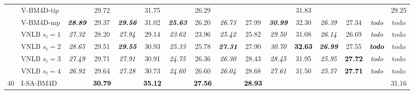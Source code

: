 \documentclass[10pt, journal, twocolumn, final, a4paper]{IEEEtran}
\newcommand{\bsic}[1]{\textcolor{black}{\textit{#1}}}
\newcommand{\Bsic}[1]{\textcolor{black}{\textbf{\textit{#1}}}}
\newcommand{\Best}[1]{\textbf{\textcolor{black}{#1}}}
\begin{document}
\begin{table}[htp!]
\begin{center}
{\begin{tabular}{ c | l |c c | c c | c c | c c | c c | c c | c c}
			                      & V-BM4D-tip           & \bsic{     } &       29.72  &              &       31.75   & \bsic{     } &       26.29   &              &              &              &       31.83   &              &              & \bsic{     } &       29.25  \\
			                      & V-BM4D-mp            & \Bsic{28.89} &       29.37  & \Bsic{29.56} &       31.02   & \Bsic{25.63} &       26.20   & \bsic{26.73} &       27.99  & \Bsic{30.99} &       32.30   & \bsic{26.39} &       27.34  & \bsic{todo } &       todo   \\
			                      & VNLB   $s_t = 1$     & \bsic{27.32} &       28.20  & \bsic{27.94} &       29.14   & \bsic{23.62} &       23.96   & \bsic{25.42} &       25.82  & \bsic{29.50} &       31.08   & \bsic{26.14} &       26.69  & \bsic{todo } &       todo   \\
										 & VNLB   $s_t = 2$     & \bsic{28.65} &       29.51  & \Bsic{29.55} &       30.93   & \bsic{25.33} &       25.78   & \Bsic{27.31} &       27.90  & \bsic{30.70} & \Best{32.63}  & \Bsic{26.99} &       27.55  & \Bsic{todo } &       todo   \\
										 & VNLB   $s_t = 3$     & \bsic{27.49} &       29.71  & \bsic{27.91} &       30.91   & \bsic{24.75} &       26.36   & \bsic{26.30} &       28.43  & \bsic{28.45} &       31.95   & \bsic{25.95} & \Best{27.72} & \bsic{todo } &       todo   \\
			                      & VNLB   $s_t = 4$     & \bsic{26.92} &       29.64  & \bsic{27.28} &       30.73   & \bsic{24.60} &       26.60   & \bsic{26.04} &       28.68  & \bsic{27.61} &       31.50   & \bsic{25.57} & \Best{27.71} & \bsic{todo } &       todo   \\\hline
%                                                                                                                                                                                                                                                                         
			\multirow{1}{*}{$40$}                                                                                                                                                                                                                                            
			                      & I-SA-BM4D            & \bsic{     } & \Best{30.79} & \bsic{     } & \Best{35.12}  & \bsic{     } & \Best{27.56}  & \bsic{     } & \Best{28.93} &              &               &              &              & \bsic{     } &       31.16  \\

\end{tabular}}
\end{center}
\end{table}
\end{document}
